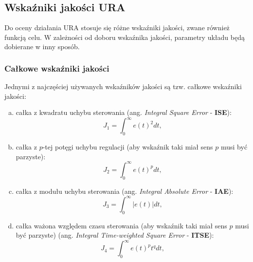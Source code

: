 \documentclass{article}
\begin{document}
    \subsection{Wskaźniki jakości URA}
    Do oceny działania URA stosuje się różne wskaźniki jakości, zwane również funkcją celu.
    W zależności od doboru wskaźnika jakości, parametry układu będą dobierane w inny sposób.

        \subsubsection{Całkowe wskaźniki jakości}
        Jednymi z najczęściej używanych wskaźników jakości są tzw. całkowe wskaźniki jakości:
        \begin{enumerate}[(a)]
            \item całka z kwadratu uchybu sterowania (ang. \textit{Integral
            Square Error} - \textbf{ISE}):
                \begin{equation}
                    \label{eq:j1}
                    J_{1} = \int_{0}^{\infty}{e(t)^{2}dt},
                \end{equation}
    
            \item całka z $p$-tej potęgi uchybu regulacji (aby wskaźnik taki miał sens $p$ musi być parzyste):
                \begin{equation}
                    \label{eq:j2}
                    J_{2} = \int_{0}^{\infty}{e(t)^{p}dt},
                \end{equation}
    
            \item całka z modułu uchybu sterowania (ang. \textit{Integral Absolute Error} - \textbf{IAE}):
                \begin{equation}
                    \label{eq:j3}
                    J_{3} = \int_{0}^{\infty}{|e(t)|dt},
                \end{equation}
    
            \item całka ważona względem czasu sterowania (aby wskaźnik taki miał
            sens $p$ musi być parzyste) (ang. \textit{Integral Time-weighted Square Error} - \textbf{ITSE}):
                \begin{equation}
                    \label{eq:j4}
                    J_{4} = \int_{0}^{\infty}{e(t)^{p}t^{q}dt},
                \end{equation}
    

\end{enumerate}
\end{document}
